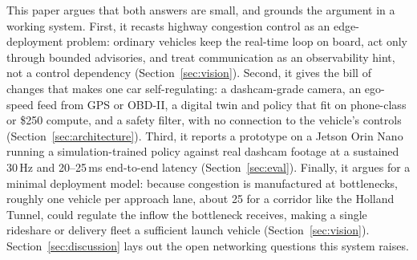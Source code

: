 This paper argues that both answers are small, and grounds the argument in a working system. First, it recasts highway congestion control as an edge-deployment problem: ordinary vehicles keep the real-time loop on board, act only through bounded advisories, and treat communication as an observability hint, not a control dependency (Section~\ref{sec:vision}). Second, it gives the bill of changes that makes one car self-regulating: a dashcam-grade camera, an ego-speed feed from GPS or OBD-II, a digital twin and policy that fit on phone-class or \$250 compute, and a safety filter, with no connection to the vehicle's controls (Section~\ref{sec:architecture}). Third, it reports a prototype on a Jetson Orin Nano running a simulation-trained policy against real dashcam footage at a sustained 30\,Hz and 20--25\,ms end-to-end latency (Section~\ref{sec:eval}). Finally, it argues for a minimal deployment model: because congestion is manufactured at bottlenecks, roughly one vehicle per approach lane, about 25 for a corridor like the Holland Tunnel, could regulate the inflow the bottleneck receives, making a single rideshare or delivery fleet a sufficient launch vehicle (Section~\ref{sec:vision}). Section~\ref{sec:discussion} lays out the open networking questions this system raises.
